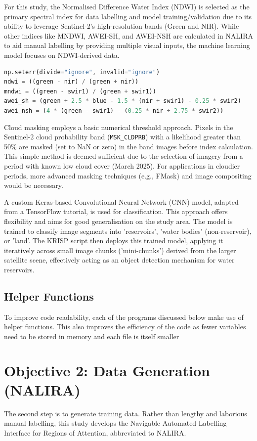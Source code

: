 For this study, the Normalised Difference Water Index (NDWI) is selected as the primary spectral index for data labelling and model training/validation due to its ability to leverage Sentinel-2's high-resolution bands (Green and NIR). While other indices like MNDWI, AWEI-SH, and AWEI-NSH are calculated in NALIRA to aid manual labelling by providing multiple visual inputs, the machine learning model focuses on NDWI-derived data.

\begin{lstlisting}[language=Python, caption=Calculation of Water Detection Indices]
np.seterr(divide="ignore", invalid="ignore")
ndwi = ((green - nir) / (green + nir))
mndwi = ((green - swir1) / (green + swir1))
awei_sh = (green + 2.5 * blue - 1.5 * (nir + swir1) - 0.25 * swir2)
awei_nsh = (4 * (green - swir1) - (0.25 * nir + 2.75 * swir2))
\end{lstlisting}

Cloud masking employs a basic numerical threshold approach. Pixels in the Sentinel-2 cloud probability band (\verb|MSK_CLDPRB|) with a likelihood greater than 50\% are masked (set to NaN or zero) in the band images before index calculation. This simple method is deemed sufficient due to the selection of imagery from a period with known low cloud cover (March 2025). For applications in cloudier periods, more advanced masking techniques (e.g., FMask) and image compositing would be necessary.

A custom Keras-based Convolutional Neural Network (CNN) model, adapted from a TensorFlow tutorial, is used for classification. This approach offers flexibility and aims for good generalisation on the study area. The model is trained to classify image segments into 'reservoirs', 'water bodies' (non-reservoir), or 'land'. The KRISP script then deploys this trained model, applying it iteratively across small image chunks ('mini-chunks') derived from the larger satellite scene, effectively acting as an object detection mechanism for water reservoirs.

\subsection{Helper Functions}
To improve code readability, each of the programs discussed below make use of helper functions. This also improves the efficiency of the code as fewer variables need to be stored in memory and each file is itself smaller

\section{Objective 2: Data Generation (NALIRA)}
The second step is to generate training data. Rather than lengthy and laborious manual labelling, this study develops the Navigable Automated Labelling Interface for Regions of Attention, abbreviated to NALIRA. 

